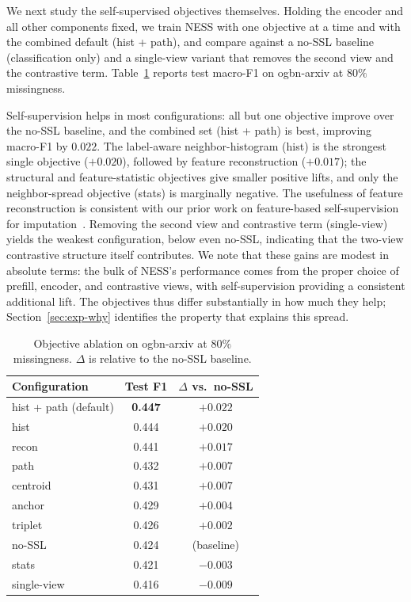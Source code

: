 We next study the self-supervised objectives themselves. Holding the encoder and all other components fixed, we train NESS with one objective at a time and with the combined default (hist + path), and compare against a no-SSL baseline (classification only) and a single-view variant that removes the second view and the contrastive term. Table~\ref{tab:objectives} reports test macro-F1 on ogbn-arxiv at $80\%$ missingness.

Self-supervision helps in most configurations: all but one objective improve over the no-SSL baseline, and the combined set (hist + path) is best, improving macro-F1 by $0.022$. The label-aware neighbor-histogram (hist) is the strongest single objective ($+0.020$), followed by feature reconstruction ($+0.017$); the structural and feature-statistic objectives give smaller positive lifts, and only the neighbor-spread objective (stats) is marginally negative. The usefulness of feature reconstruction is consistent with our prior work on feature-based self-supervision for imputation~\cite{moshiri2026neighborhood}. Removing the second view and contrastive term (single-view) yields the weakest configuration, below even no-SSL, indicating that the two-view contrastive structure itself contributes.
We note that these gains are modest in absolute terms: the bulk of NESS's performance comes from the proper choice of prefill, encoder, and contrastive views, with self-supervision providing a consistent additional lift.
The objectives thus differ substantially in how much they help; Section~\ref{sec:exp-why} identifies the property that explains this spread.

\begin{table}[t]
\centering
\caption{Objective ablation on ogbn-arxiv at $80\%$ missingness. $\Delta$ is relative to the no-SSL baseline.}
\label{tab:objectives}
\small
\begin{tabular}{@{}lcc@{}}
\toprule
\textbf{Configuration} & \textbf{Test F1} & \textbf{$\Delta$ vs.\ no-SSL} \\
\midrule
hist + path (default) & \textbf{0.447} & $+0.022$ \\
hist                  & 0.444 & $+0.020$ \\
recon                 & 0.441 & $+0.017$ \\
path                  & 0.432 & $+0.007$ \\
centroid              & 0.431 & $+0.007$ \\
anchor                & 0.429 & $+0.004$ \\
triplet               & 0.426 & $+0.002$ \\
no-SSL                & 0.424 & (baseline) \\
stats                 & 0.421 & $-0.003$ \\
single-view           & 0.416 & $-0.009$ \\
\bottomrule
\end{tabular}
\end{table}



